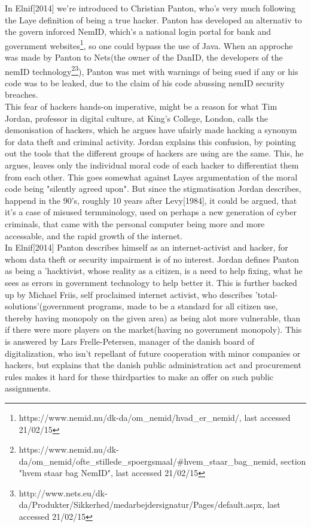 \documentclass[paper=a4, fontsize=11pt]{scrartcl} %
\numberwithin{equation}{section} %
\numberwithin{figure}{section} %
\numberwithin{table}{section} %
\begin{document}
	In Elnif[2014] we're introduced to Christian Panton, who's very much following the Laye definition of being a true hacker. Panton has developed an alternativ to the govern inforced NemID, which's a national login portal for bank and government websites\footnote{https://www.nemid.nu/dk-da/om\_nemid/hvad\_er\_nemid/, last accessed 21/02/15}, so one could bypass the use of Java\cite{info}. When an approche was made by Panton to Nets(the owner of the DanID, the developers of the nemID technology\footnote{https://www.nemid.nu/dk-da/om\_nemid/ofte\_stillede\_spoergsmaal/\#hvem\_staar\_bag\_nemid, section "hvem staar bag NemID", last accessed 21/02/15}\footnote{http://www.nets.eu/dk-da/Produkter/Sikkerhed/medarbejdersignatur/Pages/default.aspx, last accessed 21/02/15}), Panton was met with warnings of being sued if any or his code was to be leaked, due to the claim of his code abussing nemID security breaches. \\
	
	This fear of hackers hands-on imperative, might be a reason for what Tim Jordan, professor in digital culture, at King's College, London, calls the demonisation of hackers, which he argues have ufairly made hacking a synonym for data theft and criminal activity\cite{info}. Jordan explains this confusion, by pointing out the tools that the different groups of hackers are using are the same. This, he argues, leaves only the individual moral code of each hacker to differentiat them from each other\cite{info}. This goes somewhat against Layes argumentation of the moral code being "silently agreed upon"\cite{HEM}. But since the stigmatisation Jordan describes, happend in the 90's, roughly 10 years after Levy[1984], it could be argued, that it's a case of misused termminology, used on perhaps a new generation of cyber criminals, that came with the personal computer being more and more accessable, and the rapid growth of the internet.\\
	
	In Elnif[2014] Panton describes himself as an internet-activist and hacker, for whom data theft or security impairment is of no interest\cite{info}. Jordan defines Panton as being a 'hacktivist, whose reality as a citizen, is a need to help fixing, what he sees as errors in government technology to help better it\cite{info}. This is further backed up by Michael Friis, self proclaimed internet activist, who describes 'total-solutions'(government programs, made to be a standard for all citizen use, thereby having monopoly on the given area) as being alot more vulnerable, than if there were more players on the market(having no government monopoly). This is answered by Lars Frelle-Petersen, manager of the danish board of digitalization, who isn't repellant of future cooperation with minor companies or hackers, but explains that the danish public administration act and procurement rules makes it hard for these thirdparties to make an offer on such public assignments. \\
	
\end{document}
